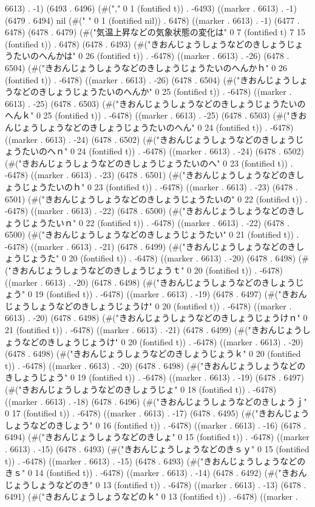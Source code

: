 6613) . -1) (6493 . 6496) (#("," 0 1 (fontified t)) . -6493) ((marker . 6613) . -1) (6479 . 6494) nil (#(" " 0 1 (fontified nil)) . 6478) ((marker . 6613) . -1) (6477 . 6478) (6478 . 6479) (#("気温上昇などの気象状態の変化は" 0 7 (fontified t) 7 15 (fontified t)) . 6478) (6478 . 6493) (#("きおんじょうしょうなどのきしょうじょうたいのへんかは" 0 26 (fontified t)) . -6478) ((marker . 6613) . -26) (6478 . 6504) (#("きおんじょうしょうなどのきしょうじょうたいのへんかｈ" 0 26 (fontified t)) . -6478) ((marker . 6613) . -26) (6478 . 6504) (#("きおんじょうしょうなどのきしょうじょうたいのへんか" 0 25 (fontified t)) . -6478) ((marker . 6613) . -25) (6478 . 6503) (#("きおんじょうしょうなどのきしょうじょうたいのへんｋ" 0 25 (fontified t)) . -6478) ((marker . 6613) . -25) (6478 . 6503) (#("きおんじょうしょうなどのきしょうじょうたいのへん" 0 24 (fontified t)) . -6478) ((marker . 6613) . -24) (6478 . 6502) (#("きおんじょうしょうなどのきしょうじょうたいのへｎ" 0 24 (fontified t)) . -6478) ((marker . 6613) . -24) (6478 . 6502) (#("きおんじょうしょうなどのきしょうじょうたいのへ" 0 23 (fontified t)) . -6478) ((marker . 6613) . -23) (6478 . 6501) (#("きおんじょうしょうなどのきしょうじょうたいのｈ" 0 23 (fontified t)) . -6478) ((marker . 6613) . -23) (6478 . 6501) (#("きおんじょうしょうなどのきしょうじょうたいの" 0 22 (fontified t)) . -6478) ((marker . 6613) . -22) (6478 . 6500) (#("きおんじょうしょうなどのきしょうじょうたいｎ" 0 22 (fontified t)) . -6478) ((marker . 6613) . -22) (6478 . 6500) (#("きおんじょうしょうなどのきしょうじょうたい" 0 21 (fontified t)) . -6478) ((marker . 6613) . -21) (6478 . 6499) (#("きおんじょうしょうなどのきしょうじょうた" 0 20 (fontified t)) . -6478) ((marker . 6613) . -20) (6478 . 6498) (#("きおんじょうしょうなどのきしょうじょうｔ" 0 20 (fontified t)) . -6478) ((marker . 6613) . -20) (6478 . 6498) (#("きおんじょうしょうなどのきしょうじょう" 0 19 (fontified t)) . -6478) ((marker . 6613) . -19) (6478 . 6497) (#("きおんじょうしょうなどのきしょうじょうけ" 0 20 (fontified t)) . -6478) ((marker . 6613) . -20) (6478 . 6498) (#("きおんじょうしょうなどのきしょうじょうけｎ" 0 21 (fontified t)) . -6478) ((marker . 6613) . -21) (6478 . 6499) (#("きおんじょうしょうなどのきしょうじょうけ" 0 20 (fontified t)) . -6478) ((marker . 6613) . -20) (6478 . 6498) (#("きおんじょうしょうなどのきしょうじょうｋ" 0 20 (fontified t)) . -6478) ((marker . 6613) . -20) (6478 . 6498) (#("きおんじょうしょうなどのきしょうじょう" 0 19 (fontified t)) . -6478) ((marker . 6613) . -19) (6478 . 6497) (#("きおんじょうしょうなどのきしょうじょ" 0 18 (fontified t)) . -6478) ((marker . 6613) . -18) (6478 . 6496) (#("きおんじょうしょうなどのきしょうｊ" 0 17 (fontified t)) . -6478) ((marker . 6613) . -17) (6478 . 6495) (#("きおんじょうしょうなどのきしょう" 0 16 (fontified t)) . -6478) ((marker . 6613) . -16) (6478 . 6494) (#("きおんじょうしょうなどのきしょ" 0 15 (fontified t)) . -6478) ((marker . 6613) . -15) (6478 . 6493) (#("きおんじょうしょうなどのきｓｙ" 0 15 (fontified t)) . -6478) ((marker . 6613) . -15) (6478 . 6493) (#("きおんじょうしょうなどのきｓ" 0 14 (fontified t)) . -6478) ((marker . 6613) . -14) (6478 . 6492) (#("きおんじょうしょうなどのき" 0 13 (fontified t)) . -6478) ((marker . 6613) . -13) (6478 . 6491) (#("きおんじょうしょうなどのｋ" 0 13 (fontified t)) . -6478) ((marker . 
